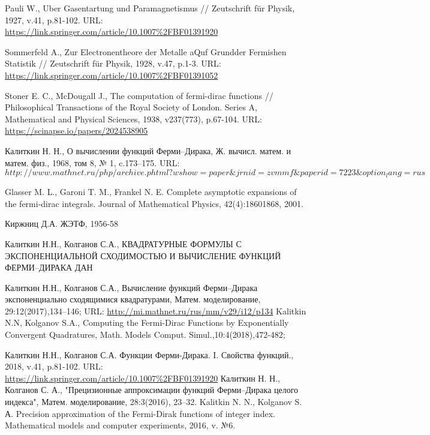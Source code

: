 
\begin{thebibliography}{99}
 Pauli W., Uber Gasentartung und Paramagnetismus // Zeutschrift für Physik,
1927, v.41, p.81-102. URL: \href{https://link.springer.com/article/10.1007\%2FBF01391920}{https://link.springer.com/article/10.1007\%2FBF01391920}

 Sommerfeld A., Zur Electronentheore der Metalle aQuf Grundder Fermishen
Statistik // Zeutschrift für Physik, 1928, v.47, p.1-3. URL: \href{https://link.springer.com/article/10.1007\%2FBF01391052}{https://link.springer.com/article/10.1007\%2FBF01391052}

 Stoner E. C., McDougall J., The computation of fermi-dirac functions //
Philosophical Transactions of the Royal Society of London. Series A, Mathematical and Physical Sciences, 1938, v237(773), p.67-104. URL: \href{https://scinapse.io/papers/2024538905}{https://scinapse.io/papers/2024538905}

 Калиткин Н. Н., О вычислении функций Ферми–Дирака, Ж. вычисл. матем. и матем. физ., 1968, том 8, № 1, c.173–175. URL: \href{http://www.mathnet.ru/php/archive.phtml?wshow=paper&jrnid=zvmmf&paperid=7223&option_lang=rus}{$http://www.mathnet.ru/php/archive.phtml?wshow=paper\&jrnid=zvmmf\&paperid=7223\&option_lang=rus$}

 Glasser M. L., Garoni T. M., Frankel N. E. Complete asymptotic expansions of the fermi-dirac integrals. Journal of Mathematical Physics, 42(4):18601868, 2001.

 Киржниц Д.А. ЖЭТФ, 1956-58

 Калиткин Н.Н., Колганов С.А., КВАДРАТУРНЫЕ ФОРМУЛЫ С ЭКСПОНЕНЦИАЛЬНОЙ СХОДИМОСТЬЮ И ВЫЧИСЛЕНИЕ ФУНКЦИЙ ФЕРМИ–ДИРАКА ДАН 

 Калиткин Н.Н., Колганов С.А., Вычисление функций Ферми–Дирака экспоненциально сходящимися квадратурами, Матем. моделирование, 29:12(2017),134–146; URL: \href{http://mi.mathnet.ru/rus/mm/v29/i12/p134}{http://mi.mathnet.ru/rus/mm/v29/i12/p134}
Kalitkin N.N, Kolganov S.A., Computing the Fermi-Dirac Functions by Exponentially Convergent Quadratures, Math. Models Comput. Simul.,10:4(2018),472-482;

 Калиткин Н.Н., Колганов С.А. Функции Ферми-Дирака. I. Свойства
функций., 2018, v.41, p.81-102.
URL: \href{https://link.springer.com/article/10.1007\%2FBF01391920}{https://link.springer.com/article/10.1007\%2FBF01391920}
 Калиткин Н. Н., Колганов С. А., "Прецизионные аппроксимации функций Ферми–Дирака целого индекса", Матем. моделирование, 28:3(2016), 23–32.
Kalitkin N. N., Kolganov S. А. Precision approximation of the Fermi-Dirak functions of integer index. Mathematical models and computer experiments, 2016, v. №6.


\end{thebibliography}
